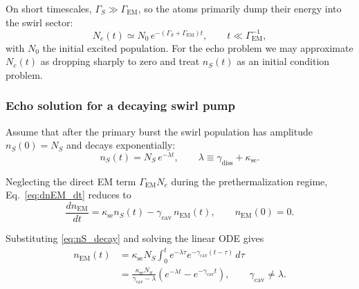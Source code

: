 \documentclass[10pt,reprint,aps,onecolumn,nofootinbib]{revtex4-2}
\begin{document}
        On short timescales, $\Gamma_S \gg \Gamma_{\mathrm{EM}}$, so the atoms
        primarily dump their energy into the swirl sector:
        \begin{equation}
            N_e(t)
            \simeq
            N_0\, e^{-(\Gamma_S + \Gamma_{\mathrm{EM}}) t},
            \qquad
            t \ll \Gamma_{\mathrm{EM}}^{-1},
        \end{equation}
        with $N_0$ the initial excited population. For the echo problem we may
        approximate $N_e(t)$ as dropping sharply to zero and treat
        $n_S(t)$ as an initial condition problem.

    \subsubsection{Echo solution for a decaying swirl pump}
        \label{subsubsec:echo_solution}

        Assume that after the primary burst the swirl population has amplitude
        $n_S(0) = N_S$ and decays exponentially:
        \begin{equation}
            n_S(t)
            =
            N_S \, e^{-\lambda t},
            \qquad
            \lambda \equiv \gamma_{\mathrm{diss}} + \kappa_{\text{se}}.
            \label{eq:nS_decay}
        \end{equation}

        Neglecting the direct EM term $\Gamma_{\mathrm{EM}} N_e$ during the
        prethermalization regime, Eq.~\eqref{eq:dnEM_dt} reduces to
        \begin{equation}
            \frac{d n_{\mathrm{EM}}}{dt}
            =
            \kappa_{\text{se}} n_S(t)
            - \gamma_{\mathrm{cav}}\,n_{\mathrm{EM}}(t),
            \qquad
            n_{\mathrm{EM}}(0) = 0.
            \label{eq:dnEM_dt_reduced}
        \end{equation}

        Substituting \eqref{eq:nS_decay} and solving the linear ODE gives
        \begin{align}
            n_{\mathrm{EM}}(t)
            &=
            \kappa_{\text{se}} N_S
            \int_0^t e^{-\lambda \tau} e^{-\gamma_{\mathrm{cav}} (t-\tau)}\, d\tau
            \nonumber\\[4pt]
            &=
            \frac{\kappa_{\text{se}} N_S}{\gamma_{\mathrm{cav}} - \lambda}
            \left(
                e^{-\lambda t} - e^{-\gamma_{\mathrm{cav}} t}
            \right),
            \qquad
            \gamma_{\mathrm{cav}} \neq \lambda.
            \label{eq:nEM_solution}
        \end{align}
\end{document}
